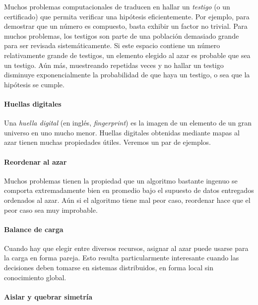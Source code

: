   Muchos problemas computacionales de traducen en hallar un \emph{testigo}
  (o un certificado)
  que permita verificar una hipótesis eficientemente.
  Por ejemplo,
  para demostrar que un número es compuesto,
  basta exhibir un factor no trivial.
  Para muchos problemas,
  los testigos son parte
  de una población demasiado grande para ser revisada sistemáticamente.
  Si este espacio contiene un número relativamente grande de testigos,
  un elemento elegido al azar es probable que sea un testigo.
  Aún más,
  muestreando repetidas veces y no hallar un testigo
  disminuye exponencialmente la probabilidad de que haya un testigo,
  o sea que la hipótesis se cumple.

\paragraph{Huellas digitales}

  Una \emph{huella digital}
  (en inglés,
   \emph{\foreignlanguage{english}{fingerprint}})
  es la imagen de un elemento de un gran universo en uno mucho menor.
  Huellas digitales obtenidas mediante mapas al azar
  tienen muchas propiedades útiles.
  Veremos un par de ejemplos.

\paragraph{Reordenar al azar}

  Muchos problemas tienen la propiedad que un algoritmo bastante ingenuo
  se comporta extremadamente bien en promedio
  bajo el supuesto de datos entregados ordenados al azar.
  Aún si el algoritmo tiene mal peor caso,
  reordenar hace que el peor caso sea muy improbable.

\paragraph{Balance de carga}

  Cuando hay que elegir entre diversos recursos,
  asignar al azar
  puede usarse para  la carga en forma pareja.
  Esto resulta particularmente interesante
  cuando las decisiones deben tomarse en sistemas distribuidos,
  en forma local sin conocimiento global.

\paragraph{Aislar y quebrar simetría}

